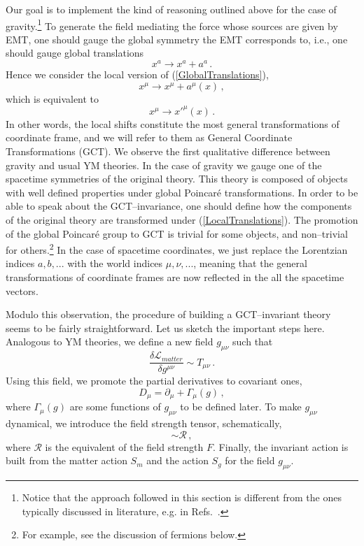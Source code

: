 \documentclass[12pt]{article}
\begin{document}
Our goal is to implement the kind of reasoning outlined above for the case of gravity.\footnote{Notice that the approach followed in this section is different from the ones typically discussed in literature, e.g. in
Refs.~\cite{Utiyama:1956sy,Kibble:1961ba,Ortin:2004ms}.}
To generate the field mediating the force whose sources are given by EMT, one should gauge the global symmetry the EMT corresponds to, i.e., one should gauge global translations
\begin{equation}\label{GlobalTranslations}
x^a\rightarrow x^a+a^a \,.
\end{equation}
Hence we consider the local version of (\ref{GlobalTranslations}),
\begin{equation}\label{LocalTranslations}
x^\mu\rightarrow x^\mu+a^\mu(x) \,,
\end{equation}
which is equivalent to
\begin{equation}
x^\mu\rightarrow x'^\mu(x) \,.
\end{equation}
In other words, the local shifts constitute the most general transformations of coordinate frame, and we will refer to them as General Coordinate Transformations (GCT). We observe the first qualitative difference between gravity and usual YM theories. In the case of gravity we gauge one of the spacetime symmetries of the original theory. This theory is composed of objects with well defined properties under global Poincar\'e transformations. In order to be able to speak about the GCT--invariance, one should define how the components of the original theory are transformed under (\ref{LocalTranslations}). The promotion of the global Poincar\'e group to GCT is trivial for some objects, and non--trivial for others.\footnote{For example, see the discussion of fermions below.}
In the case of spacetime coordinates, we just replace the Lorentzian indices $a,b,...$ with the world indices $\mu,\nu,...$, meaning that the general transformations of coordinate frames are now reflected in the all the spacetime vectors.

Modulo this observation, the procedure of building a GCT--invariant theory seems to be fairly straightforward. Let us sketch the important steps here. Analogous to YM theories, we define a new field $g_{\mu\nu}$ such that
\begin{equation}\label{TetradDef}
\dfrac{\delta\mathcal{L}_{matter}}{\delta g^{\mu\nu}}\sim T_{\mu\nu} \,.
\end{equation}
Using this field, we promote the partial derivatives to covariant ones,
\begin{equation}
D_\mu = \partial_\mu + \Gamma_\mu(g) \,,
\end{equation}
where $\Gamma_\mu(g)$ are some functions of $g_{\mu\nu}$ to be defined later. To make $g_{\mu\nu}$ dynamical, we introduce the field strength tensor, schematically,
\begin{equation}
[D,D]\sim \mathcal{R} \,,
\end{equation}
where $\mathcal{R}$ is the equivalent of the field strength $F$. Finally, the invariant action is built from the matter action $S_m$ and the action $S_g$ for the field $g_{\mu\nu}$.
\end{document}
